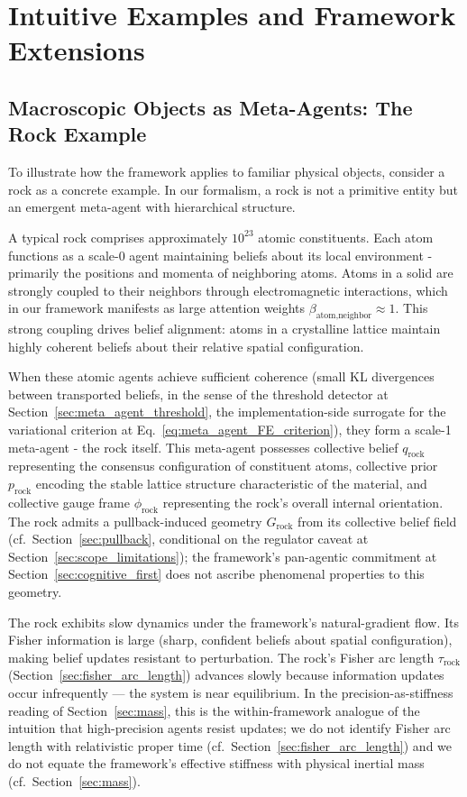 \documentclass[11pt]{article}
\begin{document}
\section{Intuitive Examples and Framework Extensions}
\label{app:examples}

\subsection{Macroscopic Objects as Meta-Agents: The Rock Example}

To illustrate how the framework applies to familiar physical objects, consider a rock as a concrete example. In our formalism, a rock is not a primitive entity but an emergent meta-agent with hierarchical structure.

A typical rock comprises approximately $10^{23}$ atomic constituents. Each atom functions as a scale-0 agent maintaining beliefs about its local environment - primarily the positions and momenta of neighboring atoms. Atoms in a solid are strongly coupled to their neighbors through electromagnetic interactions, which in our framework manifests as large attention weights $\beta_{\text{atom,neighbor}} \approx 1$. This strong coupling drives belief alignment: atoms in a crystalline lattice maintain highly coherent beliefs about their relative spatial configuration.

When these atomic agents achieve sufficient coherence (small KL divergences between transported beliefs, in the sense of the threshold detector at Section~\ref{sec:meta_agent_threshold}, the implementation-side surrogate for the variational criterion at Eq.~\eqref{eq:meta_agent_FE_criterion}), they form a scale-1 meta-agent - the rock itself. This meta-agent possesses collective belief $q_{\text{rock}}$ representing the consensus configuration of constituent atoms, collective prior $p_{\text{rock}}$ encoding the stable lattice structure characteristic of the material, and collective gauge frame $\phi_{\text{rock}}$ representing the rock's overall internal orientation. The rock admits a pullback-induced geometry $G_{\text{rock}}$ from its collective belief field (cf.\ Section~\ref{sec:pullback}, conditional on the regulator caveat at Section~\ref{sec:scope_limitations}); the framework's pan-agentic commitment at Section~\ref{sec:cognitive_first} does not ascribe phenomenal properties to this geometry.

The rock exhibits slow dynamics under the framework's natural-gradient flow. Its Fisher information is large (sharp, confident beliefs about spatial configuration), making belief updates resistant to perturbation. The rock's Fisher arc length $\tau_{\text{rock}}$ (Section~\ref{sec:fisher_arc_length}) advances slowly because information updates occur infrequently — the system is near equilibrium. In the precision-as-stiffness reading of Section~\ref{sec:mass}, this is the within-framework analogue of the intuition that high-precision agents resist updates; we do not identify Fisher arc length with relativistic proper time (cf.\ Section~\ref{sec:fisher_arc_length}) and we do not equate the framework's effective stiffness with physical inertial mass (cf.\ Section~\ref{sec:mass}).
\end{document}
